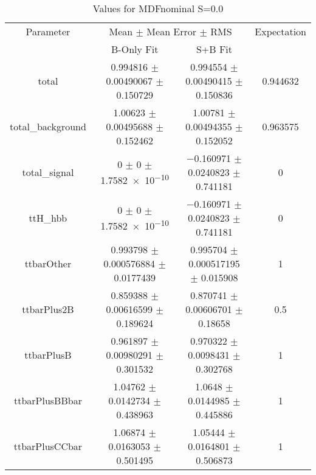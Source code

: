 \begin{table}
\centering
\caption{Values for MDFnominal S=0.0}
\begin{tabular}{cccc}
\toprule
Parameter & \multicolumn{2}{c}{Mean $\pm$ Mean Error $\pm$ RMS} & Expectation\\
 & B-Only Fit & S+B Fit & \\
\midrule
total & \num{0.994816} $\pm$ \num{0.00490067} $\pm$ \num{0.150729} & \num{0.994554} $\pm$ \num{0.00490415} $\pm$ \num{0.150836} & \num{0.944632}\\
total\_background & \num{1.00623} $\pm$ \num{0.00495688} $\pm$ \num{0.152462} & \num{1.00781} $\pm$ \num{0.00494355} $\pm$ \num{0.152052} & \num{0.963575}\\
total\_signal & \num{0} $\pm$ \num{0} $\pm$ \num{1.7582e-10} & \num{-0.160971} $\pm$ \num{0.0240823} $\pm$ \num{0.741181} & \num{0}\\
ttH\_hbb & \num{0} $\pm$ \num{0} $\pm$ \num{1.7582e-10} & \num{-0.160971} $\pm$ \num{0.0240823} $\pm$ \num{0.741181} & \num{0}\\
ttbarOther & \num{0.993798} $\pm$ \num{0.000576884} $\pm$ \num{0.0177439} & \num{0.995704} $\pm$ \num{0.000517195} $\pm$ \num{0.015908} & \num{1}\\
ttbarPlus2B & \num{0.859388} $\pm$ \num{0.00616599} $\pm$ \num{0.189624} & \num{0.870741} $\pm$ \num{0.00606701} $\pm$ \num{0.18658} & \num{0.5}\\
ttbarPlusB & \num{0.961897} $\pm$ \num{0.00980291} $\pm$ \num{0.301532} & \num{0.970322} $\pm$ \num{0.0098431} $\pm$ \num{0.302768} & \num{1}\\
ttbarPlusBBbar & \num{1.04762} $\pm$ \num{0.0142734} $\pm$ \num{0.438963} & \num{1.0648} $\pm$ \num{0.0144985} $\pm$ \num{0.445886} & \num{1}\\
ttbarPlusCCbar & \num{1.06874} $\pm$ \num{0.0163053} $\pm$ \num{0.501495} & \num{1.05444} $\pm$ \num{0.0164801} $\pm$ \num{0.506873} & \num{1}\\
\bottomrule
\end{tabular}
\end{table}